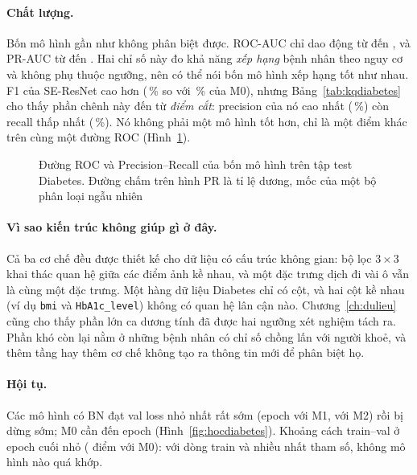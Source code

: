 \paragraph{Chất lượng.} Bốn mô hình gần như không phân biệt được. ROC-AUC chỉ dao động từ 
đến , và PR-AUC từ  đến .
Hai chỉ số này đo khả năng \emph{xếp hạng} bệnh nhân theo nguy cơ và không phụ thuộc ngưỡng, nên có thể nói bốn mô hình xếp
hạng tốt như nhau. F1 của SE-ResNet cao hơn (\,\% so với \,\% của M0),
nhưng Bảng~\ref{tab:kqdiabetes} cho thấy phần chênh này đến từ \emph{điểm cắt}: precision của nó cao nhất
(\,\%) còn recall thấp nhất (\,\%). Nó không phải
một mô hình tốt hơn, chỉ là một điểm khác trên cùng một đường ROC (Hình~\ref{fig:rocpr}).

\begin{figure}[H]
  \centering
  \caption{Đường ROC và Precision--Recall của bốn mô hình trên tập test Diabetes. Đường chấm trên hình PR là tỉ lệ dương, mốc của một bộ phân loại ngẫu nhiên}
  \label{fig:rocpr}
\end{figure}

\paragraph{Vì sao kiến trúc không giúp gì ở đây.} Cả ba cơ chế đều được thiết kế cho dữ liệu có cấu trúc không gian: bộ lọc
$3\times3$ khai thác quan hệ giữa các điểm ảnh kề nhau, và một đặc trưng dịch đi vài ô vẫn là cùng một đặc trưng. Một hàng
dữ liệu Diabetes chỉ có  cột, và hai cột kề nhau (ví dụ \texttt{bmi} và
\texttt{HbA1c\_level}) không có quan hệ lân cận nào. Chương~\ref{ch:dulieu} cũng cho thấy phần lớn ca dương tính đã được
hai ngưỡng xét nghiệm tách ra. Phần khó còn lại nằm ở những bệnh nhân có chỉ số chồng lấn với người khoẻ, và thêm tầng hay
thêm cơ chế không tạo ra thông tin mới để phân biệt họ.

\paragraph{Hội tụ.} Các mô hình có BN đạt val loss nhỏ nhất rất sớm (epoch  với M1,
 với M2) rồi bị dừng sớm; M0 cần đến epoch 
(Hình~\ref{fig:hocdiabetes}). Khoảng cách train--val ở epoch cuối nhỏ ( điểm với M0): với  dòng
train và nhiều nhất  tham số, không mô hình nào quá khớp.

